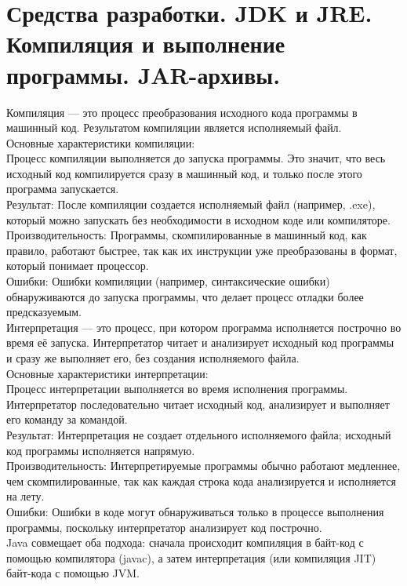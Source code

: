 \section{Средства разработки. JDK и JRE. Компиляция и выполнение программы. JAR-архивы.}
\normalsize{Компиляция — это процесс преобразования исходного кода программы в машинный код. Результатом компиляции является исполняемый файл. \\
Основные характеристики компиляции: \\
Процесс компиляции выполняется до запуска программы. Это значит, что весь исходный код компилируется сразу в машинный код, и только после этого программа запускается. \\
Результат: После компиляции создается исполняемый файл (например, .exe), который можно запускать без необходимости в исходном коде или компиляторе. \\
Производительность: Программы, скомпилированные в машинный код, как правило, работают быстрее, так как их инструкции уже преобразованы в формат, который понимает процессор. \\
Ошибки: Ошибки компиляции (например, синтаксические ошибки) обнаруживаются до запуска программы, что делает процесс отладки более предсказуемым. \\
Интерпретация — это процесс, при котором программа исполняется построчно во время её запуска. Интерпретатор читает и анализирует исходный код программы и сразу же выполняет его, без создания исполняемого файла. \\
Основные характеристики интерпретации: \\
Процесс интерпретации выполняется во время исполнения программы. Интерпретатор последовательно читает исходный код, анализирует и выполняет его команду за командой. \\
Результат: Интерпретация не создает отдельного исполняемого файла; исходный код программы исполняется напрямую. \\
Производительность: Интерпретируемые программы обычно работают медленнее, чем скомпилированные, так как каждая строка кода анализируется и исполняется на лету. \\
Ошибки: Ошибки в коде могут обнаруживаться только в процессе выполнения программы, поскольку интерпретатор анализирует код построчно. \\
Java совмещает оба подхода: сначала происходит компиляция в байт-код с помощью компилятора (javac), а затем интерпретация (или компиляция JIT) байт-кода с помощью JVM. \\
}
